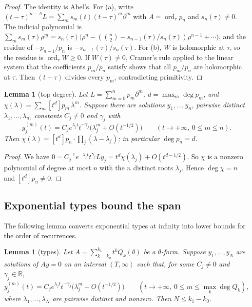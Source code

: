 \documentclass[11pt,a4paper]{article}
\newtheorem{lemma}[theorem]{Lemma}
\theoremstyle{definition}
\theoremstyle{remark}
\newcommand{\R}{\mathbb R}
\newcommand{\ff}[2]{#1^{\underline{#2}}}
\DeclareMathOperator{\ord}{ord}
\numberwithin{equation}{section}
\begin{document}
\begin{proof}
The identity is Abel's. For (a), write $(t-\tau)^{n-A}L=\sum_m s_m(t)(t-\tau)^m\partial^m$ with $A=\ord_\tau p_n$ and $s_n(\tau)\ne0$. The indicial polynomial is $\sum_ms_m(\tau)\ff{\rho}{m}=s_n(\tau)\bigl(\rho^n-(\binom n2-s_{n-1}(\tau)/s_n(\tau))\rho^{n-1}+\cdots\bigr)$, and the residue of $-p_{n-1}/p_n$ is $-s_{n-1}(\tau)/s_n(\tau)$. For (b), $W$ is holomorphic at $\tau$, so the residue is $\ord_\tau W\ge0$. If $W(\tau)\ne0$, Cramer's rule applied to the linear system that the coefficients $p_m/p_n$ satisfy shows that all $p_m/p_n$ are holomorphic at $\tau$. Then $(t-\tau)$ divides every $p_m$, contradicting primitivity.
\end{proof}

\begin{lemma}[top degree]\label{B:lem:top}
Let $L=\sum_{m=0}^np_m\partial^m$, $d=\max_m\deg p_m$, and $\chi(\lambda)=\sum_m[t^d]p_m\,\lambda^m$. Suppose there are solutions $y_1,\dots,y_n$, pairwise distinct $\lambda_1,\dots,\lambda_n$, constants $C_j\ne0$ and $\gamma_j$ with
\[
y_j^{(m)}(t)=C_je^{\lambda_jt}t^{-\gamma_j}\bigl(\lambda_j^m+O(t^{-1/2})\bigr)\qquad(t\to+\infty,\ 0\le m\le n).
\]
Then $\chi(\lambda)=[t^d]p_n\cdot\prod_j(\lambda-\lambda_j)$; in particular $\deg p_n=d$.
\end{lemma}

\begin{proof}
We have $0=C_j^{-1}e^{-\lambda_jt}t^{\gamma_j}Ly_j=t^d\chi(\lambda_j)+O(t^{d-1/2})$. So $\chi$ is a nonzero polynomial of degree at most $n$ with the $n$ distinct roots $\lambda_j$. Hence $\deg\chi=n$ and $[t^d]p_n\ne0$.
\end{proof}

\subsection{Exponential types bound the span}
The following lemma converts exponential types at infinity into lower bounds for the order of recurrences.

\begin{lemma}[types]\label{B:lem:types}
Let $A=\sum_{k=k_0}^{k_1}t^kQ_k(\theta)$ be a $\theta$-form. Suppose $y_1,\dots,y_N$ are solutions of $Ay=0$ on an interval $(T,\infty)$ such that, for some $C_j\ne0$ and $\gamma_j\in\R$,
\[
y_j^{(m)}(t)=C_je^{\lambda_jt}t^{-\gamma_j}\bigl(\lambda_j^m+O(t^{-1/2})\bigr)\qquad(t\to+\infty,\ 0\le m\le\max_k\deg Q_k),
\]
where $\lambda_1,\dots,\lambda_N$ are pairwise distinct and \emph{nonzero}. Then $N\le k_1-k_0$.
\end{lemma}
\end{document}

